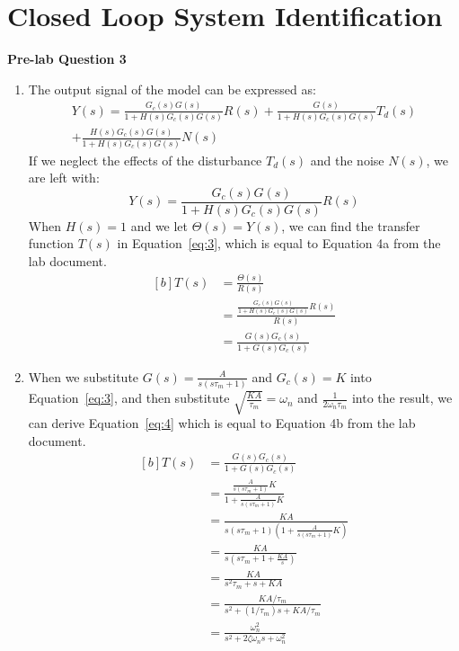 \documentclass[12pt]{article}
\begin{document}
\section{Closed Loop System Identification}
\textbf{Pre-lab Question 3}
\begin{enumerate}[label=(\roman*)]
    \item The output signal of the model can be expressed as:
    \begin{multline*}
        Y(s) = \frac{G_c(s)G(s)}{1+H(s)G_c(s)G(s)}R(s) + \frac{G(s)}{1+H(s)G_c(s)G(s)}T_d(s) \\ + \frac{H(s)G_c(s)G(s)}{1+H(s)G_c(s)G(s)}N(s)
    \end{multline*}
    If we neglect the effects of the disturbance $T_d(s)$ and the noise $N(s)$, we are left with:
    \begin{equation*}
        Y(s) = \frac{G_c(s)G(s)}{1+H(s)G_c(s)G(s)}R(s)
    \end{equation*}
    When $H(s) = 1$ and we let $\Theta(s) = Y(s)$, we can find the transfer function $T(s)$ in Equation~\ref{eq:3}, which is equal to Equation 4a from the lab document.
    \begin{equation} \label{eq:3}
    \begin{aligned}[b]
        T(s) &= \frac{\Theta(s)}{R(s)} \\
        &= \frac{\frac{G_c(s)G(s)}{1+H(s)G_c(s)G(s)}R(s)}{R(s)} \\
        &= \frac{G(s)G_c(s)}{1+G(s)G_c(s)}
    \end{aligned}
    \end{equation}
    \item When we substitute $G(s) = \frac{A}{s(s\tau_m+1)}$ and $G_c(s) = K$ into Equation~\ref{eq:3}, and then substitute $\sqrt{\frac{KA}{\tau_m}} = \omega_n $ and $\frac{1}{2\omega_n\tau_m}$ into the result, we can derive Equation~\ref{eq:4} which is equal to Equation 4b from the lab document.
    \begin{equation} \label{eq:4}
    \begin{aligned}[b]
        T(s) &= \frac{G(s)G_c(s)}{1+G(s)G_c(s)} \\
        &= \frac{\frac{A}{s(s\tau_m+1)}K} {1 + \frac{A}{s(s\tau_m+1)} K} \\
        &= \frac{KA}{s(s\tau_m+1)(1+\frac{A}{s(s\tau_m+1)}K)} \\
        &= \frac{KA}{s(s\tau_m + 1 + \frac{KA}{s})} \\
        &= \frac{KA}{s^2\tau_m + s + KA} \\
        &= \frac{KA / \tau_m}{s^2 + (1/\tau_m)s + KA / \tau_m} \\
        &= \frac{\omega_n^2}{s^2 + 2\zeta\omega_ns + \omega_n^2}
    \end{aligned}
    \end{equation}
\end{enumerate}
\end{document}
